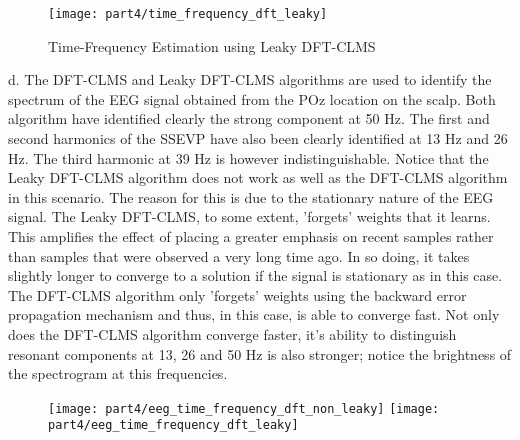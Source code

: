 \begin{figure}[H]
\centering{}
\texttt{[image: part4/time\_frequency\_dft\_leaky]}
\caption{Time-Frequency Estimation using Leaky DFT-CLMS}
\end{figure}

\noindent{}d. The DFT-CLMS and Leaky DFT-CLMS algorithms are used to identify the spectrum of the EEG signal obtained from the POz location on the scalp. Both algorithm have identified clearly the strong component at 50 Hz. The first and second harmonics of the SSEVP have also been clearly identified at 13 Hz and 26 Hz. The third harmonic at 39 Hz is however indistinguishable. Notice that the Leaky DFT-CLMS algorithm does not work as well as the DFT-CLMS algorithm in this scenario. The reason for this is due to the stationary nature of the EEG signal. The Leaky DFT-CLMS, to some extent, 'forgets' weights that it learns. This amplifies the effect of placing a greater emphasis on recent samples rather than samples that were observed a very long time ago.  In so doing, it takes slightly longer to converge to a solution if the signal is stationary as in this case. The DFT-CLMS algorithm only 'forgets' weights using the backward error propagation mechanism and thus, in this case, is able to converge fast. Not only does the DFT-CLMS algorithm converge faster, it's ability to distinguish resonant components at 13, 26 and 50 Hz is also stronger; notice the brightness of the spectrogram at this frequencies. 

\begin{figure}[H]
\centering{}
\texttt{[image: part4/eeg\_time\_frequency\_dft\_non\_leaky]}
\texttt{[image: part4/eeg\_time\_frequency\_dft\_leaky]}
\caption{}
\end{figure}





